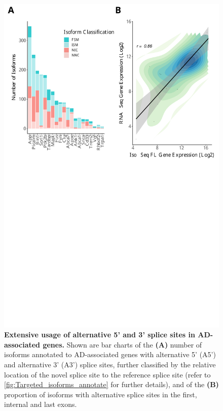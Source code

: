\begin{figure}[]
	\centering
	\includegraphics[page=10,trim={0 20cm 0 0cm},clip,scale = 0.55]{Figures/ONTvsIsoSeq.pdf}
	\captionsetup{width=0.95\textwidth}
	\caption[Characterisation of alternative 5' and 3' splice sites in AD-associated genes]%
	{\textbf{Extensive usage of alternative 5' and 3' splice sites in AD-associated genes.} Shown are bar charts of the \textbf{(A)} number of isoforms annotated to AD-associated genes with alternative 5' (A5') and alternative 3' (A3') splice sites, further classified by the relative location of the novel splice site to the reference splice site (refer to \cref{fig:Targeted_isoforms_annotate} for further details), and of the \textbf{(B)} proportion of isoforms with alternative splice sites in the first, internal and last exons.}
	\label{fig:A5A3_targeted}
\end{figure}

